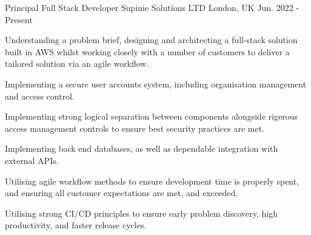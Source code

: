 



\begin{cventries}

\cventry
{Principal Full Stack Developer} %
{Supinie Solutions LTD} %
{London, UK} %
{Jun. 2022 - Present} %
{ %
\begin{cvitems}
\item {Understanding a problem brief, designing and architecting a full-stack solution built in AWS whilst working closely with a number of customers to deliver a tailored solution via an agile workflow.}
\item {Implementing a secure user accounts system, including organisation management and access control.}
\item {Implementing strong logical separation between components alongside rigerous access management controls to ensure best security practices are met.}
\item {Implementing back end databases, as well as dependable integration with external APIs.}
\item {Utilising agile workflow methods to ensure development time is properly spent, and ensuring all customer expectations are met, and exceeded.}
\item {Utilising strong CI/CD principles to ensure early problem discovery, high productivity, and faster release cycles.}
\end{cvitems}
}



\end{cventries}
